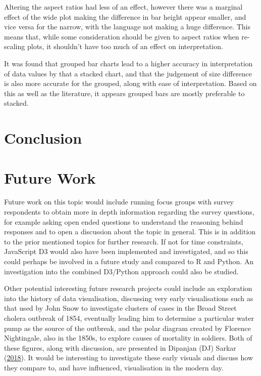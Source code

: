 \documentclass[
  11pt,
]{book}
\begin{document}
Altering the aspect ratios had less of an effect, however there was a
marginal effect of the wide plot making the difference in bar height
appear smaller, and vice versa for the narrow, with the language not
making a huge difference. This means that, while some consideration
should be given to aspect ratios when re-scaling plots, it shouldn't
have too much of an effect on interpretation.

It was found that grouped bar charts lead to a higher accuracy in
interpretation of data values by that a stacked chart, and that the
judgement of size difference is also more accurate for the grouped,
along with ease of interpretation. Based on this as well as the
literature, it appears grouped bars are mostly preferable to stacked.

\chapter{Conclusion}

\chapter{Future Work}

Future work on this topic would include running focus groups with survey
respondents to obtain more in depth information regarding the survey
questions, for example asking open ended questions to understand the
reasoning behind responses and to open a discussion about the topic in
general. This is in addition to the prior mentioned topics for further
research. If not for time constraints, JavaScript D3 would also have
been implemented and investigated, and so this could perhaps be involved
in a future study and compared to R and Python. An investigation into
the combined D3/Python approach could also be studied.

Other potential interesting future research projects could include an
exploration into the history of data visualisation, discussing very
early visualisations such as that used by John Snow to investigate
clusters of cases in the Broad Street cholera outbreak of 1854,
eventually leading him to determine a particular water pump as the
source of the outbreak, and the polar diagram created by Florence
Nightingale, also in the 1850s, to explore causes of mortality in
soldiers. Both of these figures, along with discussion, are presented in
Dipanjan (DJ) Sarkar (\protect\hyperlink{ref-grammar}{2018}). It would
be interesting to investigate these early visuals and discuss how they
compare to, and have influenced, visualisation in the modern day.
\end{document}
